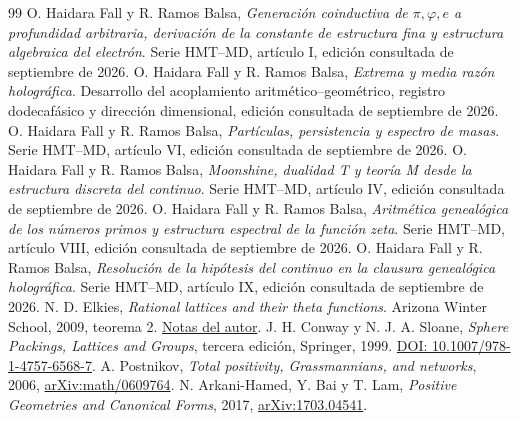 \documentclass[a4paper,10pt]{article}
\theoremstyle{definition}\newtheorem{definition}[theorem]{Definición}
\theoremstyle{remark}\newtheorem{remark}[theorem]{Observación}
\numberwithin{equation}{section}
\begin{document}
\begin{thebibliography}{99}
 O. Haidara Fall y R. Ramos Balsa,
\emph{Generación coinductiva de \(\pi,\varphi,e\) a profundidad arbitraria,
derivación de la constante de estructura fina y estructura algebraica del
electrón}. Serie HMT--MD, artículo I, edición consultada de septiembre de 2026.
 O. Haidara Fall y R. Ramos Balsa,
\emph{Extrema y media razón holográfica}. Desarrollo del acoplamiento
aritmético--geométrico, registro dodecafásico y dirección dimensional,
edición consultada de septiembre de 2026.
 O. Haidara Fall y R. Ramos Balsa,
\emph{Partículas, persistencia y espectro de masas}. Serie HMT--MD, artículo VI,
edición consultada de septiembre de 2026.
 O. Haidara Fall y R. Ramos Balsa,
\emph{Moonshine, dualidad T y teoría M desde la estructura discreta del
continuo}. Serie HMT--MD, artículo IV, edición consultada de septiembre de 2026.
 O. Haidara Fall y R. Ramos Balsa,
\emph{Aritmética genealógica de los números primos y estructura espectral
de la función zeta}. Serie HMT--MD, artículo VIII, edición consultada de septiembre de 2026.
 O. Haidara Fall y R. Ramos Balsa,
\emph{Resolución de la hipótesis del continuo en la clausura genealógica
holográfica}. Serie HMT--MD, artículo IX, edición consultada de septiembre de 2026.
 N. D. Elkies,
\emph{Rational lattices and their theta functions}. Arizona Winter School,
2009, teorema 2.
\href{https://people.math.harvard.edu/~elkies/aws09.pdf}{Notas del autor}.
 J. H. Conway y N. J. A. Sloane,
\emph{Sphere Packings, Lattices and Groups}, tercera edición, Springer, 1999.
\href{https://doi.org/10.1007/978-1-4757-6568-7}{DOI: 10.1007/978-1-4757-6568-7}.
 A. Postnikov,
\emph{Total positivity, Grassmannians, and networks}, 2006,
\href{https://arxiv.org/abs/math/0609764}{arXiv:math/0609764}.
 N. Arkani-Hamed, Y. Bai y T. Lam,
\emph{Positive Geometries and Canonical Forms}, 2017,
\href{https://arxiv.org/abs/1703.04541}{arXiv:1703.04541}.
\end{thebibliography}
\end{document}
